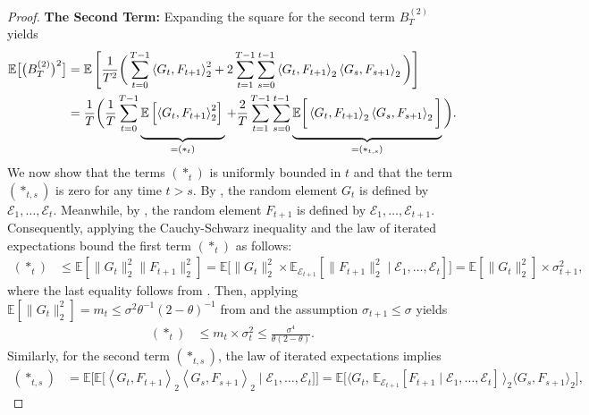 \documentclass[a4paper, 11pt]{article}
\newcommand{\E}{\mathbb E}
\newcommand{\T}{\mathcal E}
\theoremstyle{definition}
\begin{document}
\begin{proof}
    \vspace{5pt}
    \noindent
    \textbf{The Second Term:}
    Expanding the square for the second term $B_T^{(2)}$ yields
    \begin{align}
		\E\big[ \big( B_T^{(2)} \big)^2 \big] & = \E\left[ \frac{1}{T^2} \bigg( \sum_{t=0}^{T-1} \left\langle G_t, F_{t+1} \right\rangle_2^2 + 2 \sum_{t=1}^{T-1} \sum_{s=0}^{t-1} \left\langle G_t, F_{t+1} \right\rangle_2 \left\langle G_s, F_{s+1} \right\rangle_2 \bigg) \right] \\
		& = \frac{1}{T} \bigg( \frac{1}{T} \sum_{t=0}^{T-1} \underbrace{ \E\left[ \left\langle G_t, F_{t+1} \right\rangle_2^2 \right] \vphantom{\sum_{j=0}^{t-1}} }_{ = (*_t) } + \frac{2}{T} \sum_{t=1}^{T-1} \sum_{s=0}^{t-1} \underbrace{ \E\bigg[ \left\langle G_t, F_{t+1} \right\rangle_2 \left\langle G_s, F_{s+1} \right\rangle_2 \bigg] \vphantom{\sum_{j=0}^{t-1}} }_{ = (*_{t,s}) }  \bigg) . \label{eq:B_T_bound}
	\end{align}
    We now show that the terms $(*_t)$ is uniformly bounded in $t$ and that the term $(*_{t,s})$ is zero for any time $t > s$.
	By , the random element $G_t$ is defined by $\T_1, \dots, \T_{t}$.
    Meanwhile, by , the random element $F_{t+1}$ is defined by $\T_1, \dots, \T_{t+1}$.
	Consequently, applying the Cauchy-Schwarz inequality and the law of iterated expectations bound the first term $(*_t)$ as follows:
	\begin{align}       
        (*_t) & \le \E\left[ \| G_t \|_2^2 \| F_{t+1} \|_2^2 \right] = \E\Big[ \| G_t \|_2^2 \times \E_{\T_{t+1}}\left[ \| F_{t+1} \|_2^2 \mid \T_1, \dots, \T_{t} \right] \Big] = \E\left[ \| G_t \|_2^2 \right] \times \sigma_{t+1}^2 ,
	\end{align}
	where the last equality follows from .
	Then, applying $\E[ \| G_t \|_2^2 ] = m_t \le \sigma^2 \theta^{-1} (2 - \theta)^{-1}$ from  and the assumption $\sigma_{t+1} \le \sigma$ yields
	\begin{align}
		(*_t) & \le m_t \times \sigma_t^2 \le \frac{\sigma^4}{\theta (2 - \theta)} .
	\end{align}
	Similarly, for the second term $(*_{t,s})$, the law of iterated expectations implies
	\begin{align}
		(*_{t,s}) & = \E\Big[ \E\big[ \left\langle G_t, F_{t+1} \right\rangle_2 \left\langle G_s, F_{s+1} \right\rangle_2 \mid \T_1, \dots, \T_{t} \big] \Big] = \E\Big[ \big\langle G_t , \, \E_{\T_{t+1}}\left[ F_{t+1} \mid \T_1, \dots, \T_{t} \right] \, \big\rangle_2 \big\langle G_s, F_{s+1} \big\rangle_2 \Big] ,

\end{align}
\end{proof}
\end{document}
